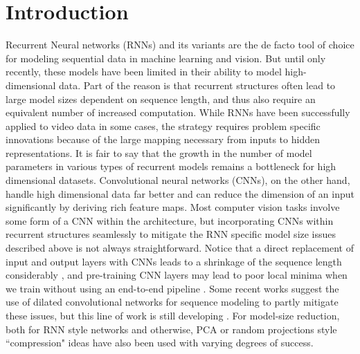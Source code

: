 \section{Introduction}\label{sec:intro}

Recurrent Neural networks (RNNs) and its variants are the de facto 
tool of choice 
for modeling sequential data in machine learning and vision.
But until only recently, these models have been limited in their ability to model high-dimensional data.
Part of the reason is that recurrent structures often lead to large model sizes dependent on sequence length, and thus also require an equivalent number of increased computation.
While RNNs have been successfully applied to video data in some cases, the strategy 
requires problem specific innovations because of the large mapping necessary 
from inputs to hidden representations. It is fair to say that the growth 
in the number of model parameters in various types of 
recurrent models remains a bottleneck for high 
dimensional datasets. 
%
Convolutional neural networks (CNNs), on the other hand, 
handle high dimensional data
far better and 
can reduce the dimension of an input significantly by deriving rich feature maps. Most computer vision tasks involve some form of a CNN within the architecture, but incorporating CNNs within recurrent structures 
seamlessly to mitigate the RNN specific model size issues described above is not always straightforward. Notice that a direct replacement of input and output layers with CNNs leads to a shrinkage of the sequence length considerably \cite{srivastava2015unsupervised}, and pre-training CNN layers may lead to poor local minima when we train without using an end-to-end pipeline \cite{donahue2015long}. Some recent works suggest the use of dilated convolutional networks 
for sequence modeling \cite{yu2015multi} to partly mitigate these issues, but this line of work is still developing \cite{zhenIccv2019}. 
For model-size reduction, both for RNN style networks and otherwise, 
PCA or random projections \cite{ye2005two,bingham2001random} style ``compression" ideas have 
also been used with varying degrees of success.

